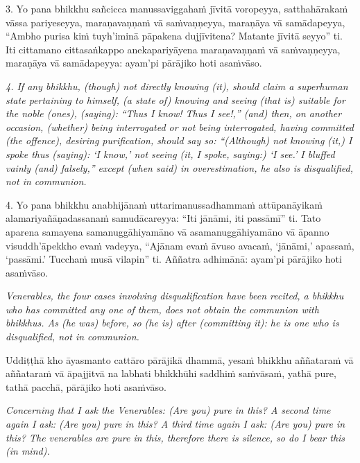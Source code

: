 \documentclass[11pt]{article}
\begin{document}
\begin{paracol}{2}
\begin{column}
\begin{flushleft}
3. Yo pana bhikkhu sañcicca manussaviggahaṁ jīvitā voropeyya, satthahārakaṁ vāssa pariyeseyya, maraṇavaṇṇaṁ vā saṁvaṇṇeyya, maraṇāya vā samādapeyya, “Ambho purisa kiṁ tuyh’iminā pāpakena dujjīvitena? Matante jīvitā seyyo” ti. Iti cittamano cittasaṅkappo anekapariyāyena maraṇavaṇṇaṁ vā saṁvaṇṇeyya, maraṇāya vā samādapeyya: ayam’pi pārājiko hoti asaṁvāso.
\switchcolumn*
\end{flushleft}

{\itshape\footnotesize
4. If any bhikkhu, (though) not directly knowing (it), should claim a superhuman state pertaining to himself, (a state of) knowing and seeing (that is) suitable for the noble (ones), (saying): “Thus I know! Thus I see!,” (and) then, on another occasion, (whether) being interrogated or not being interrogated, having committed (the offence), desiring purification, should say so: “(Although) not knowing (it,) I spoke thus (saying): `I know,’ not seeing (it, I spoke, saying:) `I see.’ I bluffed vainly (and) falsely,” except (when said) in overestimation, he also is disqualified, not in communion.
}
\switchcolumn

\begin{flushleft}
4. Yo pana bhikkhu anabhijānaṁ uttarimanussadhammaṁ attūpanāyikaṁ alamariyañāṇadassanaṁ samudācareyya: “Iti jānāmi, iti passāmī” ti. Tato aparena samayena samanuggāhiyamāno vā asamanuggāhiyamāno vā āpanno visuddh’āpekkho evaṁ vadeyya, “Ajānam evaṁ āvuso avacaṁ, ‘jānāmi,’ apassaṁ, ‘passāmi.’ Tucchaṁ musā vilapin” ti. Aññatra adhimānā: ayam’pi pārājiko hoti asaṁvāso.
\switchcolumn*
\end{flushleft}

{\itshape\footnotesize
Venerables, the four cases involving disqualification have been recited, a bhikkhu who has committed any one of them, does not obtain the communion with bhikkhus. As (he was) before, so (he is) after (committing it): he is one who is disqualified, not in communion.
}
\switchcolumn

\begin{flushleft}
Uddiṭṭhā kho āyasmanto cattāro pārājikā dhammā, yesaṁ bhikkhu aññataraṁ vā aññataraṁ vā āpajjitvā na labhati bhikkhūhi saddhiṁ saṁvāsaṁ, yathā pure, tathā pacchā, pārājiko hoti asaṁvāso.
\switchcolumn*
\end{flushleft}

{\itshape\footnotesize
Concerning that I ask the Venerables: (Are you) pure in this?
A second time again I ask: (Are you) pure in this?
A third time again I ask: (Are you) pure in this?
The venerables are pure in this, therefore there is silence, so do I bear this (in mind).
}
\switchcolumn


\end{column}
\end{paracol}
\end{document}
